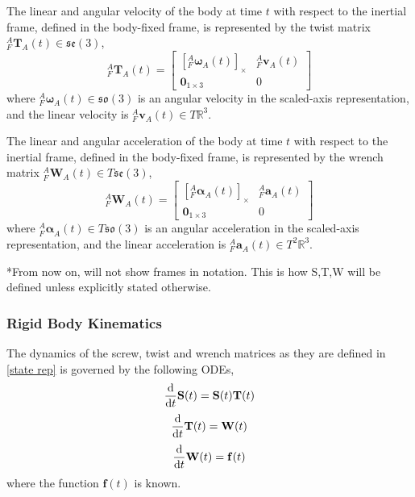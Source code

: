 		The linear and angular velocity of the body at time $t$ with respect to the inertial frame, defined in the body-fixed frame, is represented by the twist matrix ${^{A}_{F}\mathbf{T}^{}_{A}(t)} \in \mathfrak{se}(3)$,
		\begin{equation}
				{^{A}_{F}\mathbf{T}^{}_{A}(t)} = 
				\begin{bmatrix}
		  {[^{A}_{F}\mathbf{\omega}^{}_{A}(t)]_\times} 	& 	^{A}_{F}\mathbf{v}^{}_{A}(t)\\
		  \textbf{0}_{1 \times 3} & 0						  
				\end{bmatrix}
		\end{equation}
		where $^{A}_{F}\mathbf{\omega}^{}_{A}(t) \in \mathfrak{so}(3)$ is an angular velocity in the scaled-axis representation, and the linear velocity is $^{A}_{F}\mathbf{v}^{}_{A}(t) \in T\mathbb{R}^3$.
				
		The linear and angular acceleration of the body at time $t$ with respect to the inertial frame, defined in the body-fixed frame, is represented by the wrench matrix ${^{A}_{F}\mathbf{W}^{}_{A}(t)} \in T\mathfrak{se}(3)$,
		\begin{equation}
				{^{A}_{F}\mathbf{W}^{}_{A}(t)} = 
				\begin{bmatrix}
				  {[^{A}_{F}\mathbf{\alpha}^{}_{A}(t)]_\times} 	& 	^{A}_{F}\mathbf{a}^{}_{A}(t)\\
				  \textbf{0}_{1 \times 3} & 0						  
				\end{bmatrix}
		\end{equation}
		where $^{A}_{F}\mathbf{\alpha}^{}_{A}(t) \in  T\mathfrak{so}(3)$ is an angular acceleration in the scaled-axis representation, and the linear acceleration is $^{A}_{F}\mathbf{a}^{}_{A}(t) \in T^2\mathbb{R}^3$.
						
		*From now on, will not show frames in notation. This is how S,T,W will be defined unless explicitly stated otherwise.
						
	\subsubsection{Rigid Body Kinematics} \label{kinematics}
		The dynamics of the screw, twist and wrench matrices as they are defined in \ref{state rep} is governed by the following ODEs,
		\begin{equation}
			{\frac{\textnormal{d}}{\textnormal{d}t}} \mathbf{S}(t) =\mathbf{S}(t)\mathbf{T}(t)
		\end{equation}		
		\begin{equation}
			{\frac{\textnormal{d}}{\textnormal{d}t}} \mathbf{T}(t) = \mathbf{W}(t)
		\end{equation}		
		\begin{equation}
			{\frac{\textnormal{d}}{\textnormal{d}t}} \mathbf{W}(t)=\mathbf{f}(t)			
		\end{equation}
		where the function $\mathbf{f}(t)$ is known.
		
